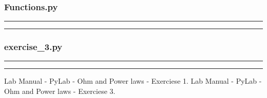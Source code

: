\documentclass[letterpaper,12pt]{article}
\begin{document}
\subsubsection{Functions.py}

\noindent\rule{\textwidth}{1pt}

\noindent\rule{\textwidth}{1pt}

\pagebreak

\subsubsection{exercise\_3.py}
\noindent\rule{\textwidth}{1pt}

\noindent\rule{\textwidth}{1pt}
\pagebreak

\begin{thebibliography}{99}

 Lab Manual - PyLab - Ohm and Power laws - Exerciese 1.
 Lab Manual - PyLab - Ohm and Power laws - Exerciese 3.

\end{thebibliography}
\end{document}
